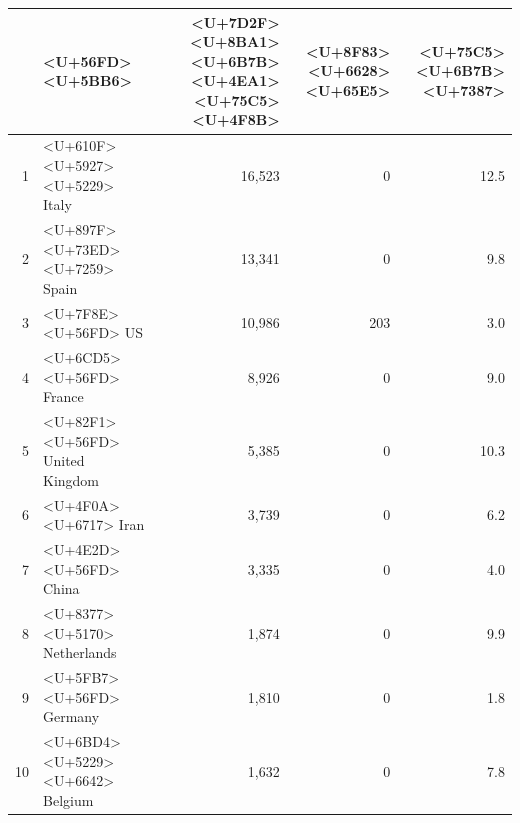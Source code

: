 \documentclass[
]{article}
\begin{document}
\begin{table}
\begin{minipage}{.4\linewidth}
    \captionsetup{justification=centering} \begin{table}[H]
\centering
\begin{tabular}{rlrrr}
\toprule
  & <U+56FD><U+5BB6> & <U+7D2F><U+8BA1><U+6B7B><U+4EA1><U+75C5><U+4F8B> & <U+8F83><U+6628><U+65E5> & <U+75C5><U+6B7B><U+7387>\\
\midrule
\rowcolor{gray!6}  1 & <U+610F><U+5927><U+5229> Italy & 16,523 & 0 & 12.5\\
2 & <U+897F><U+73ED><U+7259> Spain & 13,341 & 0 & 9.8\\
\rowcolor{gray!6}  3 & <U+7F8E><U+56FD> US & 10,986 & 203 & 3.0\\
4 & <U+6CD5><U+56FD> France & 8,926 & 0 & 9.0\\
\rowcolor{gray!6}  5 & <U+82F1><U+56FD> United Kingdom & 5,385 & 0 & 10.3\\
6 & <U+4F0A><U+6717> Iran & 3,739 & 0 & 6.2\\
\rowcolor{gray!6}  7 & <U+4E2D><U+56FD> China & 3,335 & 0 & 4.0\\
8 & <U+8377><U+5170> Netherlands & 1,874 & 0 & 9.9\\
\rowcolor{gray!6}  9 & <U+5FB7><U+56FD> Germany & 1,810 & 0 & 1.8\\
10 & <U+6BD4><U+5229><U+6642> Belgium & 1,632 & 0 & 7.8\\
\bottomrule
\end{tabular}
\end{table} \end{minipage} 
\end{table}
\end{document}
